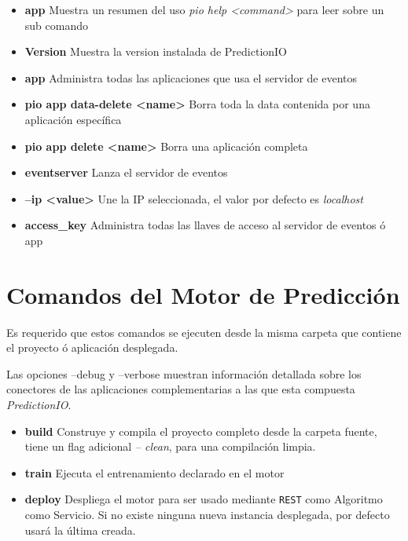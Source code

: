 \begin{itemize}
	\item \textbf{app} Muestra un resumen del uso  \emph{pio help <command>} para leer sobre un sub comando
	
	\item \textbf{Version} Muestra la version instalada de PredictionIO
	
	
	\item \textbf{app }  Administra todas las aplicaciones que usa el servidor de eventos
	\item \textbf{pio app data-delete <name> } Borra toda la data contenida por una aplicación específica
	\item \textbf{pio app delete <name> }  Borra una aplicación completa
	\item \textbf{eventserver }  Lanza el servidor de eventos
	\item \textbf{ --ip <value> } Une la IP seleccionada, el valor por defecto es \emph{localhost}
	\item \textbf{access\_key} Administra todas las llaves de acceso al servidor de eventos ó app
	
\end{itemize}


\section {Comandos del Motor de Predicción}

Es requerido que estos comandos se ejecuten desde la misma carpeta que contiene el proyecto ó aplicación desplegada.

Las opciones  --debug y --verbose  muestran información detallada sobre los conectores de las aplicaciones complementarias a las que esta compuesta \emph{PredictionIO}.

\begin{itemize}
	\item \textbf{build} Construye y compila el proyecto completo desde la carpeta fuente, tiene un flag adicional \emph{-- clean}, para una compilación limpia.

	\item \textbf{train} Ejecuta el entrenamiento declarado en el motor 

	\item \textbf{deploy} Despliega el motor para ser usado mediante \texttt{REST} como Algoritmo como Servicio. Si no existe ninguna nueva instancia  desplegada, por defecto usará la última creada.
	
\end{itemize}


